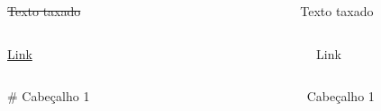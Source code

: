 \documentclass[
]{book}
\begin{document}
\begin{columns}

\begin{column}

\sout{Texto taxado}

\end{column}

\begin{column}

~

\end{column}

\begin{column}

Texto taxado

\end{column}

\end{columns}

\begin{columns}

\begin{column}

\href{des.uem.br}{Link}

\end{column}

\begin{column}

~

\end{column}

\begin{column}

Link

\end{column}

\end{columns}

\begin{columns}

\begin{column}

\# Cabeçalho 1

\end{column}

\begin{column}

~

\end{column}

\begin{column}

\hypertarget{cabeuxe7alho-1}{}
\begin{section}

Cabeçalho 1

\end{section}

\end{column}

\end{columns}
\end{document}
